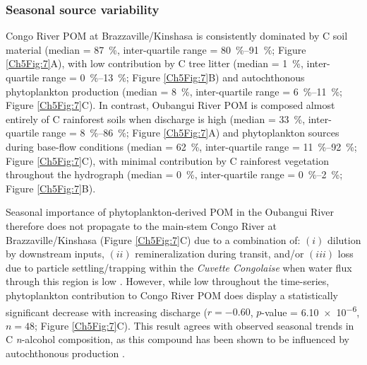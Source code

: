 \subsubsection{Seasonal source variability}

Congo River POM at Brazzaville/Kinshasa is consistently dominated by C soil material (median = \SI{87}{\%}, inter-quartile range = \SIrange{80}{91}{\%}; Figure \ref{Ch5Fig:7}A), with low contribution by C tree litter (median = \SI{1}{\%}, inter-quartile range = \SIrange{0}{13}{\%}; Figure \ref{Ch5Fig:7}B) and autochthonous phytoplankton production (median = \SI{8}{\%}, inter-quartile range = \SIrange{6}{11}{\%}; Figure \ref{Ch5Fig:7}C). In contrast, Oubangui River POM is composed almost entirely of C rainforest soils when discharge is high (median = \SI{33}{\%}, inter-quartile range = \SIrange{8}{86}{\%}; Figure \ref{Ch5Fig:7}A) and phytoplankton sources during base-flow conditions (median = \SI{62}{\%}, inter-quartile range = \SIrange{11}{92}{\%}; Figure \ref{Ch5Fig:7}C), with minimal contribution by C rainforest vegetation throughout the hydrograph (median = \SI{0}{\%}, inter-quartile range = \SIrange{0}{2}{\%}; Figure \ref{Ch5Fig:7}B). 

Seasonal importance of phytoplankton-derived POM in the Oubangui River therefore does not propagate to the main-stem Congo River at Brazzaville/Kinshasa (Figure \ref{Ch5Fig:7}C) due to a combination of: $(i)$ dilution by downstream inputs, $(ii)$ remineralization during transit, and/or $(iii)$ loss due to particle settling/trapping within the \textit{Cuvette Congolaise} when water flux through this region is low \citep{Laraque:2009fz}. However, while low throughout the time-series, phytoplankton contribution to Congo River POM does display a statistically significant decrease with increasing discharge ($r = -0.60$, $p$-value = \num{6.10e-6}, $n = 48$; Figure \ref{Ch5Fig:7}C). This result agrees with observed seasonal trends in C \textit{n}-alcohol  composition, as this compound has been shown to be influenced by autochthonous production \citep{Hemingway:2016bq}.

